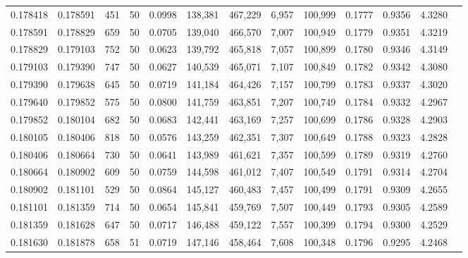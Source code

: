 \begin{tabular}{rrrrrrrrrrrrr}
0.178418 & 0.178591 &   451 &  50 &                                     0.0998 & 138,381 & 467,229 &   6,957 & 100,999 & 0.1777 & 0.9356 & 4.3280 \\
0.178591 & 0.178829 &   659 &  50 &                                     0.0705 & 139,040 & 466,570 &   7,007 & 100,949 & 0.1779 & 0.9351 & 4.3219 \\
0.178829 & 0.179103 &   752 &  50 &                                     0.0623 & 139,792 & 465,818 &   7,057 & 100,899 & 0.1780 & 0.9346 & 4.3149 \\
0.179103 & 0.179390 &   747 &  50 &                                     0.0627 & 140,539 & 465,071 &   7,107 & 100,849 & 0.1782 & 0.9342 & 4.3080 \\
0.179390 & 0.179638 &   645 &  50 &                                     0.0719 & 141,184 & 464,426 &   7,157 & 100,799 & 0.1783 & 0.9337 & 4.3020 \\
0.179640 & 0.179852 &   575 &  50 &                                     0.0800 & 141,759 & 463,851 &   7,207 & 100,749 & 0.1784 & 0.9332 & 4.2967 \\
0.179852 & 0.180104 &   682 &  50 &                                     0.0683 & 142,441 & 463,169 &   7,257 & 100,699 & 0.1786 & 0.9328 & 4.2903 \\
0.180105 & 0.180406 &   818 &  50 &                                     0.0576 & 143,259 & 462,351 &   7,307 & 100,649 & 0.1788 & 0.9323 & 4.2828 \\
0.180406 & 0.180664 &   730 &  50 &                                     0.0641 & 143,989 & 461,621 &   7,357 & 100,599 & 0.1789 & 0.9319 & 4.2760 \\
0.180664 & 0.180902 &   609 &  50 &                                     0.0759 & 144,598 & 461,012 &   7,407 & 100,549 & 0.1791 & 0.9314 & 4.2704 \\
0.180902 & 0.181101 &   529 &  50 &                                     0.0864 & 145,127 & 460,483 &   7,457 & 100,499 & 0.1791 & 0.9309 & 4.2655 \\
0.181101 & 0.181359 &   714 &  50 &                                     0.0654 & 145,841 & 459,769 &   7,507 & 100,449 & 0.1793 & 0.9305 & 4.2589 \\
0.181359 & 0.181628 &   647 &  50 &                                     0.0717 & 146,488 & 459,122 &   7,557 & 100,399 & 0.1794 & 0.9300 & 4.2529 \\
0.181630 & 0.181878 &   658 &  51 &                                     0.0719 & 147,146 & 458,464 &   7,608 & 100,348 & 0.1796 & 0.9295 & 4.2468 \\

\end{tabular}
